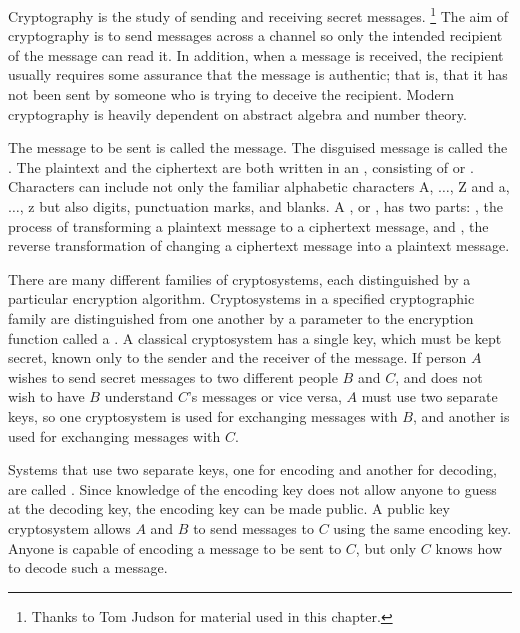 
Cryptography is the study of sending and receiving secret messages.
\footnote{Thanks to Tom Judson for material used in this chapter.}
The aim of cryptography is to send messages across a channel so only
the intended recipient of the message can read it. In addition, when a
message is received, the recipient usually requires some assurance that
the message is authentic; that is, that it has not been sent by
someone who is trying to deceive the recipient. Modern cryptography is
heavily dependent on abstract algebra and number theory. 
 
 
The message to be sent is called the  message. The disguised message is called
the . The plaintext and the
ciphertext are both written in an , consisting of  or . Characters can include not only the
familiar alphabetic characters A, $\ldots$, Z and a, $\ldots$, z but
also digits, punctuation marks, and blanks. A , or ,  has two parts: , the process
of transforming a plaintext message to a ciphertext message, and , the reverse transformation of changing a ciphertext
message into a plaintext message.
 
 
There are many different families of cryptosystems, each distinguished
by a particular encryption algorithm. Cryptosystems in a specified
cryptographic family are distinguished from one another by a parameter
to the encryption function called a . A classical cryptosystem has a single key, which must be kept
secret,  known only to the sender and the receiver of the message. If
person $A$ wishes to send secret messages to two different people $B$
and $C$, and does not wish to have $B$ understand $C$'s messages or
vice versa, $A$ must use two separate keys, so one cryptosystem is
used for exchanging messages with $B$, and another is used for
exchanging messages with $C$.
 
 
Systems that use two separate keys, one for encoding and another for
decoding, are called . Since
knowledge of the encoding key does not allow anyone to guess at the
decoding key, the encoding key can be made public. A public key
cryptosystem allows $A$ and $B$ to send messages to $C$ using the same
encoding key.  Anyone is capable of encoding a message to be sent to
$C$, but only $C$ knows how to decode such a message.
 
